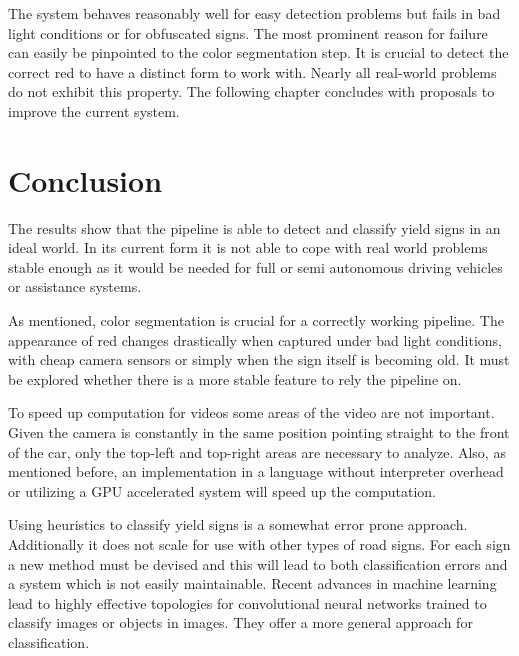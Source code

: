 \documentclass{report}
\begin{document}
The system behaves reasonably well for easy detection problems but
fails in bad light conditions or for obfuscated signs. The most
prominent reason for failure can easily be pinpointed to the color
segmentation step. It is crucial to detect the correct red to have a
distinct form to work with. Nearly all real-world problems do not
exhibit this property. The following chapter concludes with proposals
to improve the current system.

\pagebreak
\chapter{Conclusion}
\label{chap:conclusion}

The results show that the pipeline is able to detect and classify
yield signs in an ideal world. In its current form it is not able to
cope with real world problems stable enough as it would be needed for
full or semi autonomous driving vehicles or assistance systems.

As mentioned, color segmentation is crucial for a correctly working
pipeline. The appearance of red changes drastically when captured
under bad light conditions, with cheap camera sensors or simply when
the sign itself is becoming old. It must be explored whether there is
a more stable feature to rely the pipeline on.

To speed up computation for videos some areas of the video are not
important. Given the camera is constantly in the same position
pointing straight to the front of the car, only the top-left and
top-right areas are necessary to analyze. Also, as mentioned before,
an implementation in a language without interpreter overhead or
utilizing a GPU accelerated system will speed up the computation.

Using heuristics to classify yield signs is a somewhat error prone
approach. Additionally it does not scale for use with other types of
road signs. For each sign a new method must be devised and this will
lead to both classification errors and a system which is not easily
maintainable. Recent advances in machine learning lead to highly
effective topologies for convolutional neural networks trained to
classify images or objects in images. They offer a more general
approach for classification.
\end{document}
